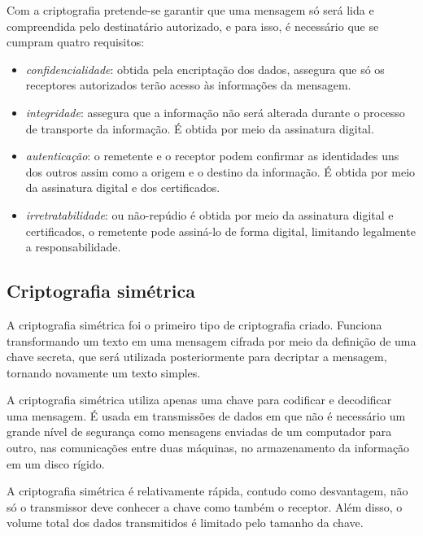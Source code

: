 Com a criptografia pretende-se garantir que uma mensagem só será lida e compreendida pelo destinatário autorizado, e para isso, é necessário que se cumpram quatro requisitos:

\begin{itemize}
\item \textit{confidencialidade}: obtida pela encriptação dos dados, assegura que só os receptores autorizados terão acesso às informações da mensagem.
\item \textit{integridade}: assegura que a informação não será alterada durante o processo de transporte da informação. É obtida por meio da assinatura digital.
\item \textit{autenticação}: o remetente e o receptor podem confirmar as identidades uns dos outros assim como a origem e o destino da informação. É obtida por meio da assinatura digital e dos certificados.
\item \textit{irretratabilidade}: ou não-repúdio é obtida por meio da assinatura digital e certificados, o remetente pode assiná-lo de forma digital, limitando legalmente a responsabilidade.
\end{itemize}

%
%
\subsection{Criptografia simétrica}
A criptografia simétrica foi o primeiro tipo de criptografia criado. Funciona transformando um texto em uma mensagem cifrada por meio da definição de uma chave secreta, que será utilizada posteriormente para decriptar a mensagem, tornando novamente um texto simples. \cite{Cavalcante:2015}

A criptografia simétrica utiliza apenas uma chave para codificar e decodificar uma mensagem. É usada em transmissões de dados em que não é necessário um grande nível de segurança como mensagens enviadas de um computador para outro, nas comunicações entre duas máquinas, no armazenamento da informação em um disco rígido.

A criptografia simétrica é relativamente rápida, contudo como desvantagem, não só o transmissor deve conhecer a chave como também o receptor. Além disso, o volume total dos dados transmitidos é limitado pelo tamanho da chave.

%
%
